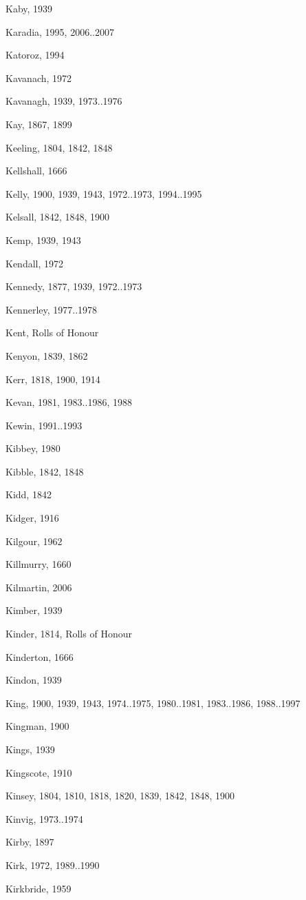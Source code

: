 {\begin{theindex}
\item Kaby, 1939
\item Karadia, 1995, 2006..2007
\item Katoroz, 1994
\item Kavanach, 1972
\item Kavanagh, 1939, 1973..1976
\item Kay, 1867, 1899
\item Keeling, 1804, 1842, 1848
\item Kellshall, 1666
\item Kelly, 1900, 1939, 1943, 1972..1973, 1994..1995
\item Kelsall, 1842, 1848, 1900
\item Kemp, 1939, 1943
\item Kendall, 1972
\item Kennedy, 1877, 1939, 1972..1973
\item Kennerley, 1977..1978
\item Kent, Rolls of Honour
\item Kenyon, 1839, 1862
\item Kerr, 1818, 1900, 1914
\item Kevan, 1981, 1983..1986, 1988
\item Kewin, 1991..1993
\item Kibbey, 1980
\item Kibble, 1842, 1848
\item Kidd, 1842
\item Kidger, 1916
\item Kilgour, 1962
\item Killmurry, 1660
\item Kilmartin, 2006
\item Kimber, 1939
\item Kinder, 1814, Rolls of Honour
\item Kinderton, 1666
\item Kindon, 1939
\item King, 1900, 1939, 1943, 1974..1975, 1980..1981, 1983..1986, 1988..1997
\item Kingman, 1900
\item Kings, 1939
\item Kingscote, 1910
\item Kinsey, 1804, 1810, 1818, 1820, 1839, 1842, 1848, 1900
\item Kinvig, 1973..1974
\item Kirby, 1897
\item Kirk, 1972, 1989..1990
\item Kirkbride, 1959

\end{theindex}}
